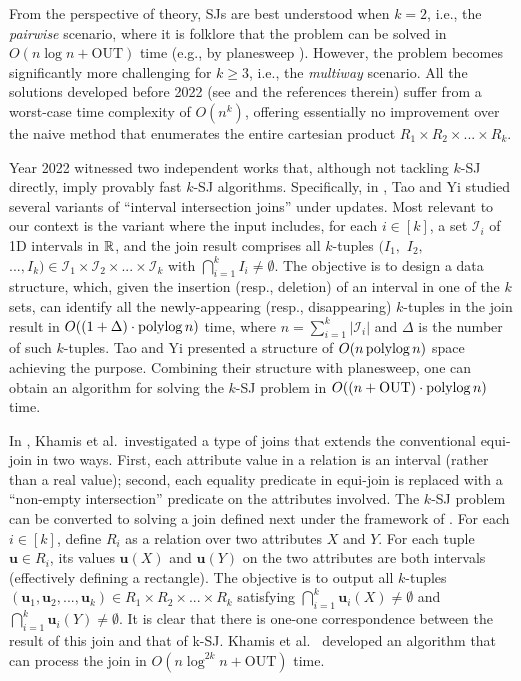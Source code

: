 \documentclass[sigconf]{acmart}
\def\vgap{\vspace{1mm}}
\def\I{\mathcal{I}}
\def\out{\mathrm{OUT}}
\begin{document}
\vgap

From the perspective of theory, SJs are best understood when $k = 2$, i.e., the {\em pairwise} scenario, where it is folklore that the problem can be solved in $O(n \log n + \out)$ time (e.g., by planesweep \cite{bcko08}). However, the problem becomes significantly more challenging for $k \ge 3$, i.e., the {\em multiway} scenario. All the solutions developed  before 2022 (see \cite{gcn+13,mp98,mp01,pmt99} and the references therein) suffer from a worst-case time complexity of $O(n^k)$, offering essentially no improvement over the naive method that enumerates the entire cartesian product $R_1 \times R_2 \times ... \times R_k$.

\vgap

Year 2022 witnessed two independent works \cite{ty22,kcko22} that, although not tackling $k$-SJ directly, imply provably fast $k$-SJ algorithms. Specifically, in \cite{ty22}, Tao and Yi studied several variants of ``interval intersection joins'' under updates. Most relevant to our context is the variant where the input includes, for each $i \in [k]$, a set $\I_i$ of 1D intervals in $\mathbb{R}$, and the join result comprises all $k$-tuples $(I_1,$ $I_2,$ $..., I_k) \in \I_1 \times \I_2 \times ... \times \I_k$ with $\bigcap_{i=1}^k I_i \neq \emptyset$. The objective is to design a data structure, which, given the insertion (resp., deletion) of an interval in one of the $k$ sets, can identify all the newly-appearing (resp., disappearing) $k$-tuples in the join result in $O((1+\Delta) \cdot \operatorname*{polylog} n)$ time, where $n = \sum_{i=1}^k |\I_i|$ and $\Delta$ is the number of such $k$-tuples. Tao and Yi \cite{ty22} presented a structure of $O(n \operatorname*{polylog} n)$ space achieving the purpose. Combining their structure with planesweep, one can obtain an algorithm for solving the $k$-SJ problem in $O((n + \out) \cdot \polylog n)$ time.

\vgap

In \cite{kcko22}, Khamis et al.\ investigated a type of joins that extends the conventional equi-join in two ways. First, each attribute value in a relation is an interval (rather than a real value); second, each equality predicate in equi-join is replaced with a ``non-empty intersection'' predicate on the attributes involved. The $k$-SJ problem can be converted to solving a join defined next under the framework of \cite{kcko22}. For each $i \in [k]$, define $R_i$ as a relation over two attributes $X$ and $Y$. For each tuple $\bm{u} \in R_i$, its values $\bm{u}(X)$ and $\bm{u}(Y)$ on the two attributes are both intervals (effectively defining a rectangle). The objective is to output all $k$-tuples $(\bm{u}_1, \bm{u}_2, ..., \bm{u}_k) \in R_1 \times R_2 \times ... \times R_k$ satisfying $\bigcap_{i=1}^k \bm{u}_i(X) \ne \emptyset$ and $\bigcap_{i=1}^k \bm{u}_i(Y) \ne \emptyset$. It is clear that there is one-one correspondence between the result of this join and that of k-SJ. Khamis et al.\ \cite{kcko22} developed an algorithm that can process the join  in $O(n \log^{2k} n + \out)$ time.
\end{document}
